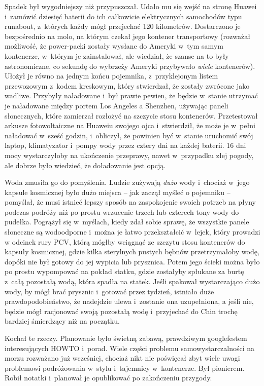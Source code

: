\documentclass[oneside,polish,11pt,rmheadings]{mwbk}
\begin{document}
Spadek był wygodniejszy niż przypuszczał. Udało mu się wejść na stronę Huawei i~zamówić dziesięć baterii do ich całkowicie elektrycznych samochodów typu runabout, z~których każdy mógł przejechać 120 kilometrów. Dostarczono je bezpośrednio na molo, na którym czekał jego kontener transportowy (rozważał możliwość, że power-packi zostały wysłane do Ameryki w~tym samym kontenerze, w~którym je zainstalował, ale wiedział, że szanse na to były astronomiczne, co sekundę do wybrzeży Ameryki przybywało \textit{wiele }kontenerów). Ułożył je równo na jednym końcu pojemnika, z~przyklejonym listem przewozowym z~kodem kreskowym, który stwierdzał, że zostały zwrócone jako wadliwe. Przybyły naładowane i~był prawie pewien, że będzie w~stanie utrzymać je naładowane między portem Los Angeles a Shenzhen, używając paneli słonecznych, które zamierzał rozłożyć na szczycie stosu kontenerów. Przetestował arkusze fotowoltaiczne na Huaweiu swojego ojca i~stwierdził, że może je w~pełni naładować w~sześć godzin, i~obliczył, że powinien być w~stanie uruchomić swój laptop, klimatyzator i~pompy wody przez cztery dni na każdej baterii. 16 dni mocy wystarczyłoby na ukończenie przeprawy, nawet w~przypadku złej pogody, ale dobrze było wiedzieć, że doładowanie jest opcją.


Woda zmusiła go do pomyślenia. Ludzie zużywają \textit{dużo }wody i~chociaż w~jego kapsule kosmicznej było dużo miejsca -- jak zaczął myśleć o pojemniku -- pomyślał, że musi istnieć lepszy sposób na zaspokojenie swoich potrzeb na płyny podczas podróży niż po prostu wrzucenie trzech lub czterech tony wody do pudełka. Pogrążył się w~myślach, kiedy zdał sobie sprawę, że wszystkie panele słoneczne są wodoodporne i~można je łatwo przekształcić w~lejek, który prowadzi w odcinek rury PCV, którą mógłby wciągnąć ze szczytu stosu kontenerów do kapsuły kosmicznej, gdzie kilka sterylnych pustych bębnów przetrzymałoby wodę, dopóki nie był gotowy do jej wypicia lub prysznica. Potem jego ścieki można było po prostu wypompować na pokład statku, gdzie zostałyby spłukane za burtę z~całą pozostałą wodą, która spadła na statek. Jeśli spakował wystarczająco dużo wody, by mógł brać prysznic i~gotować przez tydzień, istniało duże prawdopodobieństwo, że nadejdzie ulewa i~zostanie ona uzupełniona, a jeśli nie, będzie mógł racjonować swoją pozostałą wodę i~przyjechać do Chin trochę bardziej śmierdzący niż na początku.

Kochał te rzeczy. Planowanie było świetną zabawą, prawdziwym googlefestem interesujących HOWTO i~porad. Wiele części problemu samowystarczalności na morzu rozważano już wcześniej, chociaż nikt nie poświęcał zbyt wiele uwagi problemowi podróżowania w~stylu i~tajemnicy w~kontenerze. Był pionierem. Robił notatki i~planował je opublikować po zakończeniu przygody.
\end{document}
